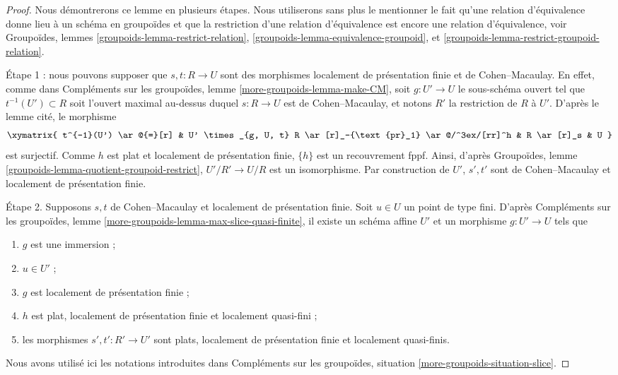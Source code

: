 \begin{proof}
Nous démontrerons ce lemme en plusieurs étapes. Nous utiliserons sans plus
le mentionner le fait qu'une relation d'équivalence donne lieu à un schéma en
groupoïdes et que la restriction d'une relation d'équivalence est encore une relation
d'équivalence, voir
Groupoïdes, lemmes
\ref{groupoids-lemma-restrict-relation},
\ref{groupoids-lemma-equivalence-groupoid}, et
\ref{groupoids-lemma-restrict-groupoid-relation}.

\medskip\noindent
Étape 1 : nous pouvons supposer que $s, t : R \to U$ sont des morphismes
localement de présentation finie et de Cohen--Macaulay. En effet, comme dans
Compléments sur les groupoïdes, lemme \ref{more-groupoids-lemma-make-CM},
soit $g : U' \to U$ le sous-schéma ouvert tel que
$t^{-1}(U') \subset R$ soit l'ouvert maximal au-dessus duquel $s : R \to U$ est
de Cohen--Macaulay, et notons $R'$ la restriction de $R$ à $U'$.
D'après le lemme cité, le morphisme
$$
\xymatrix{
t^{-1}(U') \ar@{=}[r] &
U' \times_{g, U, t} R \ar[r]_-{\text{pr}_1} \ar@/^3ex/[rr]^h &
R \ar[r]_s &
U
}
$$
est surjectif. Comme $h$ est plat et localement de présentation finie,
$\{h\}$ est un recouvrement fppf. Ainsi, d'après
Groupoïdes, lemme \ref{groupoids-lemma-quotient-groupoid-restrict},
$U'/R' \to U/R$ est un isomorphisme. Par construction de $U'$,
$s', t'$ sont de Cohen--Macaulay et localement de présentation finie.

\medskip\noindent
Étape 2. Supposons $s, t$ de Cohen--Macaulay et localement de présentation finie.
Soit $u \in U$ un point de type fini. D'après
Compléments sur les groupoïdes, lemme \ref{more-groupoids-lemma-max-slice-quasi-finite},
il existe un schéma affine $U'$ et un morphisme $g : U' \to U$ tels que
\begin{enumerate}
\item $g$ est une immersion ;
\item $u \in U'$ ;
\item $g$ est localement de présentation finie ;
\item $h$ est plat, localement de présentation finie et localement quasi-fini ;
\item les morphismes $s', t' : R' \to U'$ sont plats, localement de
présentation finie et localement quasi-finis.
\end{enumerate}
Nous avons utilisé ici les notations introduites dans
Compléments sur les groupoïdes, situation \ref{more-groupoids-situation-slice}.


\end{proof}
